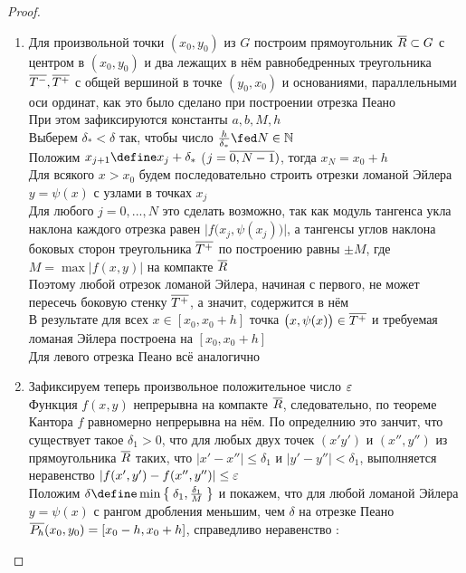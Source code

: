 \begin{proof}
	\hfill
    \begin{enumerate}
        \item Для произвольной точки $ (x_0, y_0) $ из $ G $ построим прямоугольник $ \overline{R} \subset G $ с центром в $ (x_0, y_0) $ и два лежащих в нём равнобедренных треугольника $ \overline{T^-}, \overline{T^+} $ с общей вершиной в точке $ (y_0, x_0) $ и основаниями, параллельными оси ординат, как это было сделано при построении отрезка Пеано \\
        При этом зафиксируются константы $ a, b, M, h $ \\
        Выберем $ \delta_* < \delta $ так, чтобы число $ \frac{h}{\delta_*} \fed N \in \N $ \\
        Положим $ x_{j + 1} \define x_j + \delta_* $ ($ j = \overline{0, N - 1}) $, тогда $ x_N = x_0 + h $ \\
        Для всякого $ x > x_0 $ будем последовательно строить отрезки ломаной Эйлера $ y = \psi(x) $ с узлами в точках $ x_j $ \\
        Для любого $ j = 0, ..., N $ это сделать возможно, так как модуль тангенса укла наклона каждого отрезка равен $ \big| f \big(x_j, \psi(x_j) \big) \big| $, а тангенсы углов наклона боковых сторон треугольника $ \overline{T^+} $ по построению равны $ \pm M $, где $ M = \max|f(x, y)| $ на компакте $ \overline{R} $ \\
        Поэтому любой отрезок ломаной Эйлера, начиная с первого, не может пересечь боковую стенку $ \overline{T^+} $, а значит, содержится в нём \\
        В результате для всех $ x \in [x_0, x_0 + h] $ точка $ \big( x, \psi(x) \big) \in \overline{T^+} $ и требуемая ломаная Эйлера построена на $ [x_0, x_0 + h] $ \\
        Для левого отрезка Пеано всё аналогично
        \item Зафиксируем теперь произвольное положительное число $ \varepsilon $ \\
        Функция $ f(x, y) $ непрерывна на компакте $ \overline{R} $, следовательно, по теореме Кантора $ f $ равномерно непрерывна на нём. По определнию это занчит, что существует такое $ \delta_1 > 0 $, что для любых двух точек $ (x' y') $ и $ (x'', y'') $ из прямоугольника $ \overline{R} $ таких, что $ |x' - x''| \le \delta_1 $ и $ |y' - y''| < \delta_1 $, выполняется неравенство $ |f(x', y') - f(x'', y'')| \le \varepsilon $ \\
        Положим $ \delta \define \min\set{\delta_1, \frac{\delta_1}M} $ и покажем, что для любой ломаной Эйлера $ y = \psi(x) $ с рангом дробления меньшим, чем $ \delta $ на отрезке Пеано $ \overline{P_h}(x_0, y_0) = [x_0 - h, x_0 + h] $, справедливо неравенство : \\

\end{enumerate}
\end{proof}
